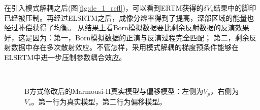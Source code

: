 在引入模式解耦之后(图\ref{fig:de_1_refl})，可以看到ERTM获得的$\delta
V_s$结果中的脚印已经被压制。再经过ELSRTM之后，成像分辨率得到了提高，深部区域的能量也经过补偿获得了均衡。
从结果上看Born模拟数据要比剩余反射数据的反演效果好，这是因为：第一，Born模拟数据的正演与反演过程完全匹配；
第二，剩余反射数据中存在多次散射效应。不管怎样，采用模式解耦的梯度预条件能够在ELSRTM中进一步压制参数耦合效应。
\begin{figure}[!hbt]
   \centering
   \\
   \caption{B方式修改后的Marmousi-II真实模型与偏移模型：左侧为$V_p$，右侧为$V_s$。第一行为真实模型，第二行为偏移模型。}
   \label{fig:TrueAndInitial_2}
\end{figure}

